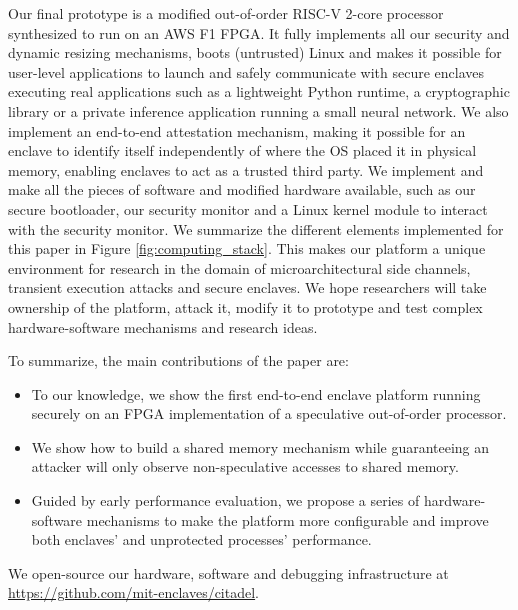 Our final prototype is a modified out-of-order RISC-V 2-core processor synthesized to run on an AWS F1 FPGA.
It fully implements all our security and dynamic resizing mechanisms, boots (untrusted) Linux and makes it possible for user-level applications to launch and safely communicate with secure enclaves executing real applications such as a lightweight Python runtime, a cryptographic library or a private inference application running a small neural network.
We also implement an end-to-end attestation mechanism, making it possible for an enclave to identify itself independently of where the OS placed it in physical memory, enabling enclaves to act as a trusted third party.
We implement and make all the pieces of software and modified hardware available, such as our secure bootloader, our security monitor and a Linux kernel module to interact with the security monitor.
We summarize the different elements implemented for this paper in Figure \ref{fig:computing_stack}.
This makes our platform a unique environment for research in the domain of microarchitectural side channels, transient execution attacks and secure enclaves.
We hope researchers will take ownership of the platform, attack it, modify it to prototype and test complex hardware-software mechanisms and research ideas.

To summarize, the main contributions of the paper are:
\begin{itemize}
\itemsep-0.1em
\item To our knowledge, we show the first end-to-end enclave platform running securely on an FPGA implementation of a speculative out-of-order processor.
\item We show how to build a shared memory mechanism while guaranteeing an attacker will only observe non-speculative accesses to shared memory.
\item Guided by early performance evaluation, we propose a series of hardware-software mechanisms to make the platform more configurable and improve both enclaves' and unprotected processes' performance.
\end{itemize}

We open-source our hardware, software and debugging infrastructure at \url{https://github.com/mit-enclaves/citadel}.